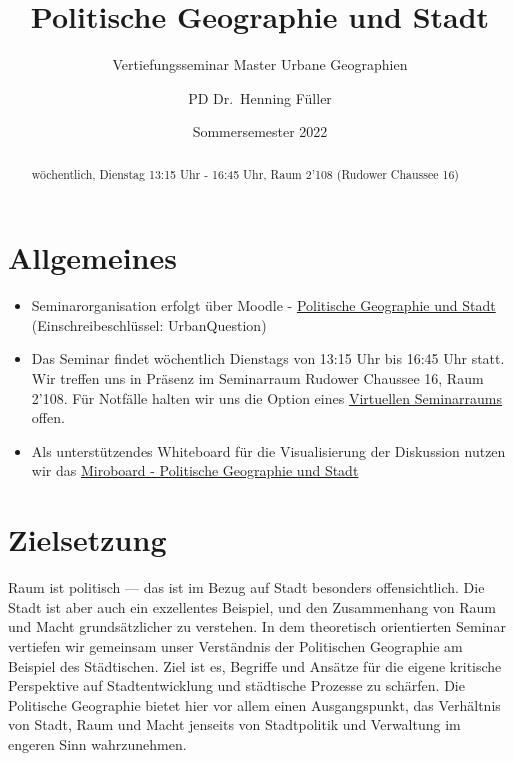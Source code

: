\documentclass[
]{article}
\title{Politische Geographie und Stadt}
\subtitle{Vertiefungsseminar Master Urbane Geographien}
\author{PD Dr.~Henning Füller}
\date{Sommersemester 2022}
\begin{document}
\maketitle
\begin{abstract}
wöchentlich, Dienstag 13:15 Uhr - 16:45 Uhr, Raum 2'108 (Rudower Chaussee 16)
\end{abstract}

{
\hypersetup{linkcolor=}
\setcounter{tocdepth}{2}
\tableofcontents
}
\hypertarget{allgemeines}{%
\section*{Allgemeines}\label{allgemeines}}

\begin{itemize}
\item
  Seminarorganisation erfolgt über Moodle - \href{https://moodle.hu-berlin.de/course/view.php?id=110334\#}{Politische Geographie und Stadt} (Einschreibeschlüssel: UrbanQuestion)
\item
  Das Seminar findet wöchentlich Dienstags von 13:15 Uhr bis 16:45 Uhr statt. Wir treffen uns in Präsenz im Seminarraum Rudower Chaussee 16, Raum 2'108. Für Notfälle halten wir uns die Option eines \href{https://moodle.hu-berlin.de/mod/zoom/view.php?id=2822640\&forceview=1}{Virtuellen Seminarraums} offen.
\item
  Als unterstützendes Whiteboard für die Visualisierung der Diskussion nutzen wir das \href{https://miro.com/app/board/uXjVO938_ew=/?share_link_id=791375936145}{Miroboard - Politische Geographie und Stadt}
\end{itemize}

\hypertarget{zielsetzung}{%
\section*{Zielsetzung}\label{zielsetzung}}

Raum ist politisch --- das ist im Bezug auf Stadt besonders offensichtlich. Die Stadt ist aber auch ein exzellentes Beispiel, und den Zusammenhang von Raum und Macht grundsätzlicher zu verstehen. In dem theoretisch orientierten Seminar vertiefen wir gemeinsam unser Verständnis der Politischen Geographie am Beispiel des Städtischen. Ziel ist es, Begriffe und Ansätze für die eigene kritische Perspektive auf Stadtentwicklung und städtische Prozesse zu schärfen. Die Politische Geographie bietet hier vor allem einen Ausgangspunkt, das Verhältnis von Stadt, Raum und Macht jenseits von Stadtpolitik und Verwaltung im engeren Sinn wahrzunehmen.
\end{document}
